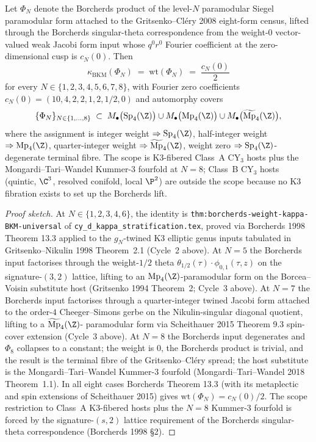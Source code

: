 \begin{theorem}\label{thm:agent14-universal-bkm}
Let $\Phi_N$ denote the Borcherds product of the level-$N$
paramodular Siegel paramodular form attached to the
Gritsenko--Cl\'ery 2008 eight-form census, lifted through the
Borcherds singular-theta correspondence from the weight-$0$
vector-valued weak Jacobi form input whose $q^0 r^0$ Fourier
coefficient at the zero-dimensional cusp is $c_N(0)$. Then
\[
  \kappa_{\mathrm{BKM}}(\Phi_N)
    \;=\; \mathrm{wt}(\Phi_N)
    \;=\; \frac{c_N(0)}{2}
\]
for every $N \in \{1, 2, 3, 4, 5, 6, 7, 8\}$, with Fourier zero
coefficients $c_N(0) = (10, 4, 2, 2, 1, 2, 1/2, 0)$ and
automorphy covers
\[
  \{\Phi_N\}_{N \in \{1, \ldots, 8\}} \;\subset\;
    M_\bullet\bigl(\mathrm{Sp}_4(\Z)\bigr)
    \cup M_\bullet\bigl(\mathrm{Mp}_4(\Z)\bigr)
    \cup M_\bullet\bigl(\widetilde{\mathrm{Mp}}_4(\Z)\bigr),
\]
where the assignment is integer weight $\Rightarrow
\mathrm{Sp}_4(\Z)$, half-integer weight $\Rightarrow
\mathrm{Mp}_4(\Z)$, quarter-integer weight $\Rightarrow
\widetilde{\mathrm{Mp}}_4(\Z)$, weight zero $\Rightarrow
\mathrm{Sp}_4(\Z)$-degenerate terminal fibre. The scope is
K3-fibered Class~A CY$_3$ hosts plus the Mongardi--Tari--Wandel
Kummer-$3$ fourfold at $N = 8$; Class~B CY$_3$ hosts (quintic,
$\C^3$, resolved conifold, local $\P^2$) are outside the scope
because no K3 fibration exists to set up the Borcherds lift.
\end{theorem}

\begin{proof}[Proof sketch]
At $N \in \{1, 2, 3, 4, 6\}$, the identity is
\texttt{thm:borcherds-weight-kappa-BKM-universal} of
\texttt{cy\_d\_kappa\_stratification.tex}, proved via
Borcherds 1998 Theorem 13.3 applied to the $g_N$-twined K3
elliptic genus inputs tabulated in Gritsenko--Nikulin 1998
Theorem~2.1 (Cycle~2 above). At $N = 5$ the Borcherds input
factorises through the weight-$1/2$ theta $\theta_{1/2}(\tau)
\cdot \phi_{0, 1}(\tau, z)$ on the signature-$(3, 2)$ lattice,
lifting to an $\mathrm{Mp}_4(\Z)$-paramodular form on the
Borcea--Voisin substitute host (Gritsenko 1994 Theorem~2;
Cycle~3 above). At $N = 7$ the Borcherds input factorises
through a quarter-integer twined Jacobi form attached to the
order-$4$ Cheeger--Simons gerbe on the Nikulin-singular
diagonal quotient, lifting to a $\widetilde{\mathrm{Mp}}_4(\Z)$-
paramodular form via Scheithauer 2015 Theorem 9.3 spin-cover
extension (Cycle~3 above). At $N = 8$ the Borcherds input
degenerates and $\Phi_8$ collapses to a constant; the weight is
$0$, the Borcherds product is trivial, and the result is the
terminal fibre of the Gritsenko--Cl\'ery spread; the host
substitute is the Mongardi--Tari--Wandel Kummer-$3$ fourfold
(Mongardi--Tari--Wandel 2018 Theorem~1.1). In all eight cases
Borcherds Theorem 13.3 (with its metaplectic and spin
extensions of Scheithauer 2015) gives $\mathrm{wt}(\Phi_N) =
c_N(0)/2$. The scope restriction to Class~A K3-fibered hosts
plus the $N = 8$ Kummer-$3$ fourfold is forced by the
signature-$(s, 2)$ lattice requirement of the Borcherds
singular-theta correspondence (Borcherds 1998 \S 2).
\end{proof}

